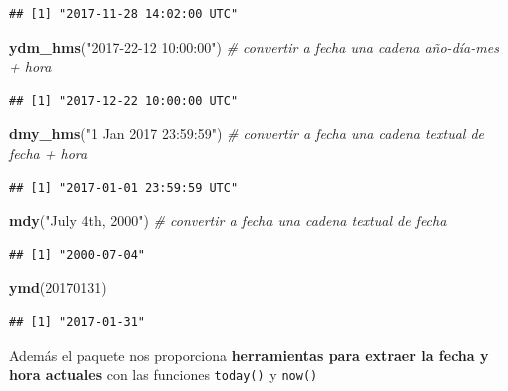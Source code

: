 \documentclass[11pt,]{book}
\newenvironment{Shaded}{\begin{snugshade}}{\end{snugshade}}
\newcommand{\CommentTok}[1]{\textcolor[rgb]{0.37,0.37,0.37}{\textit{#1}}}
\newcommand{\DecValTok}[1]{\textcolor[rgb]{0.06,0.06,0.06}{#1}}
\newcommand{\KeywordTok}[1]{\textcolor[rgb]{0.27,0.27,0.27}{\textbf{#1}}}
\newcommand{\NormalTok}[1]{#1}
\newcommand{\StringTok}[1]{\textcolor[rgb]{0.5,0.5,0.5}{#1}}
\begin{document}
\begin{verbatim}
## [1] "2017-11-28 14:02:00 UTC"
\end{verbatim}

\begin{Shaded}
\begin{Highlighting}[]
\KeywordTok{ydm_hms}\NormalTok{(}\StringTok{"2017-22-12 10:00:00"}\NormalTok{) }\CommentTok{# convertir a fecha una cadena año-día-mes + hora}
\end{Highlighting}
\end{Shaded}

\begin{verbatim}
## [1] "2017-12-22 10:00:00 UTC"
\end{verbatim}

\begin{Shaded}
\begin{Highlighting}[]
\KeywordTok{dmy_hms}\NormalTok{(}\StringTok{"1 Jan 2017 23:59:59"}\NormalTok{) }\CommentTok{# convertir a fecha una cadena textual de fecha + hora}
\end{Highlighting}
\end{Shaded}

\begin{verbatim}
## [1] "2017-01-01 23:59:59 UTC"
\end{verbatim}

\begin{Shaded}
\begin{Highlighting}[]
\KeywordTok{mdy}\NormalTok{(}\StringTok{"July 4th, 2000"}\NormalTok{) }\CommentTok{# convertir a fecha una cadena textual de fecha}
\end{Highlighting}
\end{Shaded}

\begin{verbatim}
## [1] "2000-07-04"
\end{verbatim}

\begin{Shaded}
\begin{Highlighting}[]
\KeywordTok{ymd}\NormalTok{(}\DecValTok{20170131}\NormalTok{)}
\end{Highlighting}
\end{Shaded}

\begin{verbatim}
## [1] "2017-01-31"
\end{verbatim}

Además el paquete nos proporciona \textbf{herramientas para extraer la fecha y hora actuales} con las funciones \texttt{today()} y \texttt{now()}
\end{document}
